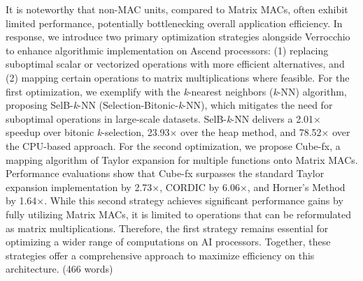 It is noteworthy that non-MAC units, compared to Matrix MACs, often exhibit limited performance, potentially bottlenecking overall application efficiency. In response, we introduce two primary optimization strategies alongside Verrocchio to enhance algorithmic implementation on Ascend processors: (1) replacing suboptimal scalar or vectorized operations with more efficient alternatives, and (2) mapping certain operations to matrix multiplications where feasible. For the first optimization, we exemplify with the \textit{k}-nearest neighbors (\textit{k}-NN) algorithm, proposing SelB-\textit{k}-NN (Selection-Bitonic-\textit{k}-NN), which mitigates the need for suboptimal operations in large-scale datasets. SelB-\textit{k}-NN delivers a 2.01$\times$ speedup over bitonic \textit{k}-selection, 23.93$\times$ over the heap method, and 78.52$\times$ over the CPU-based approach. For the second optimization, we propose Cube-fx, a mapping algorithm of Taylor expansion for multiple functions onto Matrix MACs. Performance evaluations show that Cube-fx surpasses the standard Taylor expansion implementation by 2.73$\times$, CORDIC by 6.06$\times$, and Horner's Method by 1.64$\times$. While this second strategy achieves significant performance gains by fully utilizing Matrix MACs, it is limited to operations that can be reformulated as matrix multiplications. Therefore, the first strategy remains essential for optimizing a wider range of computations on AI processors. Together, these strategies offer a comprehensive approach to maximize efficiency on this architecture. (466 words)